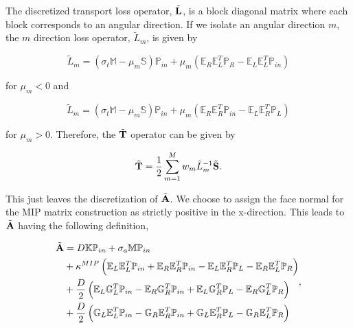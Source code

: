 \noindent The discretized transport loss operator, $\tilde{{\bf L}}$, is a block diagonal matrix where each block corresponds to an angular direction. If we isolate an angular direction $m$, the $m$ direction loss operator, $\tilde{L}_m$, is given by 

\begin{equation}
\label{eq::App_DSA_1D_L_neg}
\tilde{L}_m = \left( \sigma_t \mathbb{M} - \mu_m \mathbb{S}  \right) \mathbb{P}_{in} + \mu_m \left( \mathbb{E}_R \mathbb{E}_L^T\mathbb{P}_{R}  - \mathbb{E}_L \mathbb{E}_L^T\mathbb{P}_{in} \right)
\end{equation}

\noindent for $\mu_m < 0$ and 

\begin{equation}
\label{eq::App_DSA_1D_L_pos}
\tilde{L}_m =\left( \sigma_t \mathbb{M} - \mu_m \mathbb{S}  \right) \mathbb{P}_{in} + \mu_m \left( \mathbb{E}_R \mathbb{E}_R^T\mathbb{P}_{in}  - \mathbb{E}_L \mathbb{E}_R^T\mathbb{P}_{L} \right)
\end{equation}

\noindent for $\mu_m > 0$. Therefore, the $\tilde{{\bf T}}$ operator can be given by

\begin{equation}
\label{eq::App_DSA_1D_T}
\tilde{{\bf T}} =\frac{1}{2} \sum_{m=1}^M w_m \tilde{L}_m^{-1} \tilde{{\bf S}}.
\end{equation}

\noindent This just leaves the discretization of $\tilde{{\bf A}}$. We choose to assign the face normal for the MIP matrix construction as strictly positive in the x-direction. This leads to $\tilde{{\bf A}}$ having the following definition,

\begin{equation}
\label{eq::App_DSA_1D_A}
\begin{aligned}
\tilde{{\bf A}} &= D \mathbb{K} \mathbb{P}_{in} + \sigma_a \mathbb{M} \mathbb{P}_{in} \\
&+ \kappa^{MIP} \left( \mathbb{E}_L \mathbb{E}_L^T \mathbb{P}_{in} +   \mathbb{E}_R \mathbb{E}_R^T \mathbb{P}_{in} - \mathbb{E}_L \mathbb{E}_R^T \mathbb{P}_{L} - \mathbb{E}_R \mathbb{E}_L^T \mathbb{P}_{R} \right) \\
&+  \frac{D}{2} \left( \mathbb{E}_L \mathbb{G}_L^T \mathbb{P}_{in} - \mathbb{E}_R \mathbb{G}_R^T \mathbb{P}_{in} + \mathbb{E}_L \mathbb{G}_R^T \mathbb{P}_{L} - \mathbb{E}_R \mathbb{G}_L^T \mathbb{P}_{R} \right) \\
&+\frac{D}{2} \left(  \mathbb{G}_L \mathbb{E}_L^T \mathbb{P}_{in} - \mathbb{G}_R \mathbb{E}_R^T \mathbb{P}_{in} +  \mathbb{G}_L \mathbb{E}_R^T \mathbb{P}_{L} - \mathbb{G}_R \mathbb{E}_L^T \mathbb{P}_{R} \right)
\end{aligned} ,
\end{equation}

